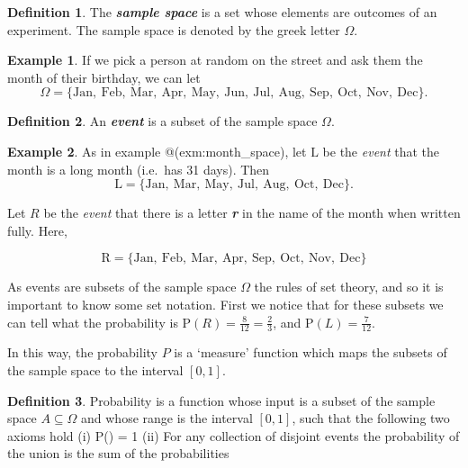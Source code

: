 \documentclass[
]{book}
\theoremstyle{definition}
\newtheorem{definition}{Definition}[chapter]
\theoremstyle{definition}
\newtheorem{example}{Example}[chapter]
\theoremstyle{definition}
\theoremstyle{definition}
\theoremstyle{remark}
\begin{document}
\begin{definition}
\protect\hypertarget{def:samplespace}{}\label{def:samplespace}The \textbf{\emph{sample space}} is a set whose elements are outcomes of an experiment. The sample space is denoted by the greek letter \(\Omega\).
\end{definition}

\begin{example}
\protect\hypertarget{exm:monthspace}{}\label{exm:monthspace}If we pick a person at random on the street and ask them the month of their birthday,
we can let
\[\Omega = \{\text{Jan}, \ \text{Feb}, \ \text{Mar},  \ \text{Apr}, \ \text{May}, \ \text{Jun}, \ \text{Jul}, \ \text{Aug}, \ \text{Sep}, \ \text{Oct}, \ \text{Nov}, \ \text{Dec} \}.\]
\end{example}

\begin{definition}
\protect\hypertarget{def:event}{}\label{def:event}An \textbf{\emph{event}} is a subset of the sample space \(\Omega\).
\end{definition}

\begin{example}
\protect\hypertarget{exm:monthspace}{}\label{exm:monthspace}As in example @(exm:month\_space), let \(\text{L}\) be the \emph{event} that the month is a long month (i.e.~has 31 days). Then
\[\text{L} = \{\text{Jan}, \ \text{Mar}, \ \text{May},  \ \text{Jul}, \ \text{Aug},  \ \text{Oct}, \ \text{Dec} \}.\]

Let \(R\) be the \emph{event} that there is a letter \textbf{\emph{r}} in the name of the month when written fully. Here,

\[\text{R} = \{\text{Jan}, \ \text{Feb}, \ \text{Mar}, \ \text{Apr},  \ \text{Sep}, \ \text{Oct}, \ \text{Nov}, \  \text{Dec} \}\]
\end{example}

As events are subsets of the sample space \(\Omega\) the rules of set theory, and so it is important to know some set notation. First we notice that for these subsets we can tell what the probability is \(\text{P}(R) = \frac{8}{12} = \frac{2}{3}\), and \(\text{P}(L) = \frac{7}{12}\).

In this way, the probability \(P\) is a `measure' function which maps the subsets of the sample space to the interval \(\left[0,1\right]\).

\begin{definition}
\protect\hypertarget{def:probability}{}\label{def:probability}Probability is a function whose input is a subset of the sample space \(A \subseteq \Omega\) and whose range is the interval \(\left[0,1\right]\), such that the following two axioms hold
(i) P(\Omega) = 1
(ii) For any collection of disjoint events the probability of the union is the sum of the probabilities
\end{definition}
\end{document}
